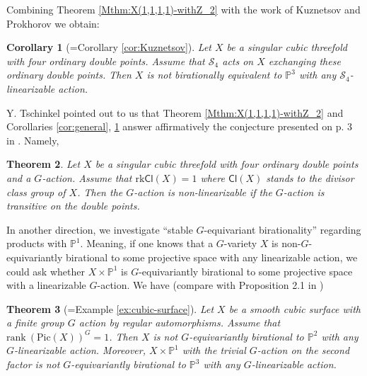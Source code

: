\documentclass[12pt,a4paper]{amsart}
\newtheorem{Mtheorem}{Theorem}
\newtheorem{Mcorollary}[Mtheorem]{Corollary}
\theoremstyle{definition}
\theoremstyle{remark}
\begin{document}
Combining Theorem \ref{Mthm:X(1,1,1,1)-withZ_2} with the work of Kuznetsov and Prokhorov \cite{Kuznetsov_Prokhorov_2024} we obtain:
    
\begin{Mcorollary}[=Corollary \ref{cor:Kuznetsov}]\label{cor:Kuznetsov-Intro}
        Let $X$ be a singular cubic threefold with four ordinary double points. Assume that $\mathcal S_4$ acts on $X$ exchanging these ordinary double points. Then $X$ is not birationally equivalent to $\mathbb P^3$ with \emph{any} $\mathcal S_4$-linearizable action.
\end{Mcorollary}

Y. Tschinkel pointed out to us that Theorem \ref{Mthm:X(1,1,1,1)-withZ_2} and Corollaries \ref{cor:general}, \ref{cor:Kuznetsov-Intro} answer affirmatively the conjecture presented on p. 3 in \cite[Case $s=4,~d=p=0$]{cheltsov2024equivariant}. Namely,
\begin{Mtheorem}
    Let $X$ be a singular cubic threefold with four ordinary double points and a $G$-action. Assume that $\mathrm{rk}\mathsf{Cl}(X)=1$ where $\mathsf{Cl}(X)$ stands to the divisor class group of $X$. Then the $G$-action is non-linearizable if the $G$-action is transitive on the double points.
\end{Mtheorem}



In another direction, we investigate ``stable $G$-equivariant birationality'' regarding products with $\mathbb P^1$. Meaning, if one knows that a $G$-variety $X$ is non-$G$-equivariantly birational to some projective space with any linearizable action, we could ask whether $X\times \mathbb P^1$ is $ G$-equivariantly birational to some projective space with a linearizable $G$-action. We have (compare with Proposition 2.1 in \cite[p. 229]{Tschinkel-Yang})
\begin{Mtheorem}[=Example \ref{ex:cubic-surface}]
     Let $X$ be a smooth cubic surface with a finite group $G$ action by regular automorphisms. Assume that $
    \mathrm{rank}~(\mathrm{Pic}(X))^{G}=1$. Then $X$ is not $G$-equivariantly birational to $\mathbb P^2$ with any $G$-linearizable action. Moreover, $X\times \mathbb P^1$ with the trivial $G$-action on the second factor is not $G$-equivariantly birational to $\mathbb P^3$ with any $G$-linearizable action.
\end{Mtheorem}
\end{document}
